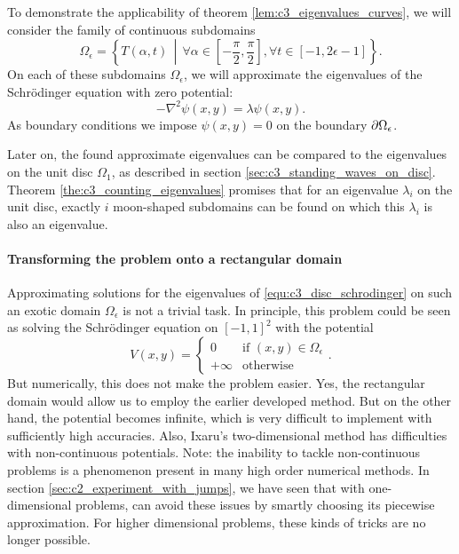 To demonstrate the applicability of theorem \ref{lem:c3_eigenvalues_curves}, we will consider the family of continuous subdomains
$$
  \Omega_\epsilon = \left\{T(\alpha, t) \,\middle|\, \forall \alpha \in \left[-\frac{\pi}{2}, \frac{\pi}{2}\right], \forall t \in [-1, 2\epsilon - 1]  \right\}\text{.}
$$
On each of these subdomains $\Omega_\epsilon$, we will approximate the eigenvalues of the Schrödinger equation with zero potential:
\begin{equation}\label{equ:c3_disc_schrodinger}
  -\nabla^2 \psi(x, y) = \lambda \psi(x, y)\text{.}
\end{equation}
As boundary conditions we impose $\psi(x, y) = 0$ on the boundary $\partial\Omega_\epsilon$.

Later on, the found approximate eigenvalues can be compared to the eigenvalues on the unit disc $\Omega_1$, as described in section \ref{sec:c3_standing_waves_on_disc}. Theorem \ref{the:c3_counting_eigenvalues} promises that for an eigenvalue $\lambda_i$ on the unit disc, exactly $i$ moon-shaped subdomains can be found on which this $\lambda_i$ is also an eigenvalue.

\paragraph{Transforming the problem onto a rectangular domain}

Approximating solutions for the eigenvalues of \eqref{equ:c3_disc_schrodinger} on such an exotic domain $\Omega_\epsilon$ is not a trivial task. In principle, this problem could be seen as solving the Schrödinger equation on $[-1,1]^2$ with the potential
$$
  V(x, y) = \begin{cases}
    0       & \text{if $(x, y)\in \Omega_\epsilon$} \\
    +\infty & \text{otherwise}
  \end{cases} {}\text{.}
$$
But numerically, this does not make the problem easier. Yes, the rectangular domain would allow us to employ the earlier developed method. But on the other hand, the potential becomes infinite, which is very difficult to implement with sufficiently high accuracies. Also, Ixaru's two-dimensional method has difficulties with non-continuous potentials. Note: the inability to tackle non-continuous problems is a phenomenon present in many high order numerical methods. In section \ref{sec:c2_experiment_with_jumps}, we have seen that with one-dimensional problems, \matslise{} can avoid these issues by smartly choosing its piecewise approximation. For higher dimensional problems, these kinds of tricks are no longer possible.

